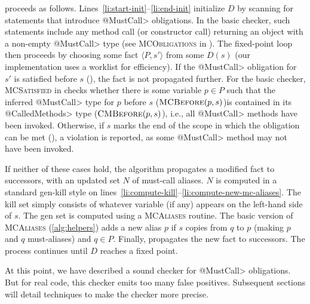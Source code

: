  proceeds as follows.
Lines~\ref{li:start-init}--\ref{li:end-init} initialize $D$ by scanning for
statements that introduce \<@MustCall> obligations.  In the basic checker, such
statements include any method call (or constructor call) returning an object
with a non-empty \<@MustCall> type (see \textsc{MCObligations} in
).  The fixed-point loop then proceeds by choosing some fact
$\langle P, s' \rangle$ from some $D(s)$ (our implementation uses a worklist for
efficiency).  If the \<@MustCall> obligation for $s'$ is satisfied before $s$
(), the fact is not propagated further.
For the basic checker, \textsc{MCSatisfied} in  checks whether
there is some variable $p \in P$ such that the inferred \<@MustCall> type for
$p$ before $s$ ($\textsc{MCBefore}(p,s)$)is contained in its \<@CalledMethods>
type ($\textsc{CMBefore}(p,s)$), i.e., all
\<@MustCall> methods have been invoked.  Otherwise, if $s$ marks the end of the
scope in which the obligation can be met (), a violation is
reported, as some \<@MustCall> method may not have been invoked.

If neither of these cases hold, the algorithm propagates a modified fact to
successors, with an updated set $N$ of must-call aliases.  $N$ is computed in a
standard gen-kill style on
lines~\ref{li:compute-kill}--\ref{li:compute-new-mc-aliases}.  The kill set
simply consists of whatever variable (if any) appears on the left-hand side of
$s$.  The gen set is computed using a \textsc{MCAliases} routine.    The basic
version of \textsc{MCAliases} (\cref{alg:helpers}) adds a new alias $p$
if $s$ copies from $q$ to $p$ (making $p$ and $q$ must-aliases) and $q \in P$.
Finally,  propagates the new fact to successors.  The
process continues until $D$ reaches a fixed point.  

At this point, we have described a sound checker for \<@MustCall> obligations.
But for real code, this checker emits too many false positives.  Subsequent
sections will detail techniques to make the checker more precise.


